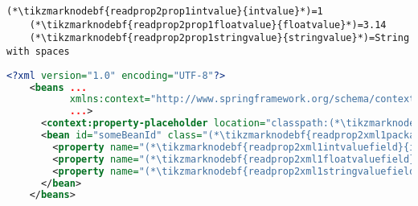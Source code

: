 \newpage

\enlargethispage{20mm}
\thispagestyle{empty}
\begin{lstlisting}[title={A \mboxtextit{.properties} file called \tikzmarknodebf{readprop2prop1filename}{\textit{setters.properties}}}]
    (*\tikzmarknodebf{readprop2prop1intvalue}{intvalue}*)=1
    (*\tikzmarknodebf{readprop2prop1floatvalue}{floatvalue}*)=3.14
    (*\tikzmarknodebf{readprop2prop1stringvalue}{stringvalue}*)=String with spaces
\end{lstlisting}
\begin{lstlisting}[language=XML, title={Configuration XML}]
    <?xml version="1.0" encoding="UTF-8"?>
    <beans ...
           xmlns:context="http://www.springframework.org/schema/context"
           ...>
      <context:property-placeholder location="classpath:(*\tikzmarknodebf{readprop2xml1filename}{setter.properties}[ForestGreen]*)" file-encoding="utf-8"/>
      <bean id="someBeanId" class="(*\tikzmarknodebf{readprop2xml1package}{somepackage.subpackage}[ForestGreen]*).(*\tikzmarknodebf{readprop2xml1class}{WantedClass}[ForestGreen]*)">
        <property name="(*\tikzmarknodebf{readprop2xml1intvaluefield}{intValueField}[ForestGreen]*)" value="(*\textcolor{ForestGreen}{\$\{}\tikzmarknodebf{readprop2xml1intvalue}{intvalue}[ForestGreen]\textcolor{ForestGreen}{\}}*)"/>
        <property name="(*\tikzmarknodebf{readprop2xml1floatvaluefield}{floatValueField}[ForestGreen]*)" value="(*\textcolor{ForestGreen}{\$\{}\tikzmarknodebf{readprop2xml1floatvalue}{floatvalue}[ForestGreen]\textcolor{ForestGreen}{\}}*)"/>
        <property name="(*\tikzmarknodebf{readprop2xml1stringvaluefield}{stringValueField}[ForestGreen]*)" value="(*\textcolor{ForestGreen}{\$\{}\tikzmarknodebf{readprop2xml1stringvalue}{stringvalue}[ForestGreen]\textcolor{ForestGreen}{\}}*)"/>
      </bean>
    </beans>
\end{lstlisting}
